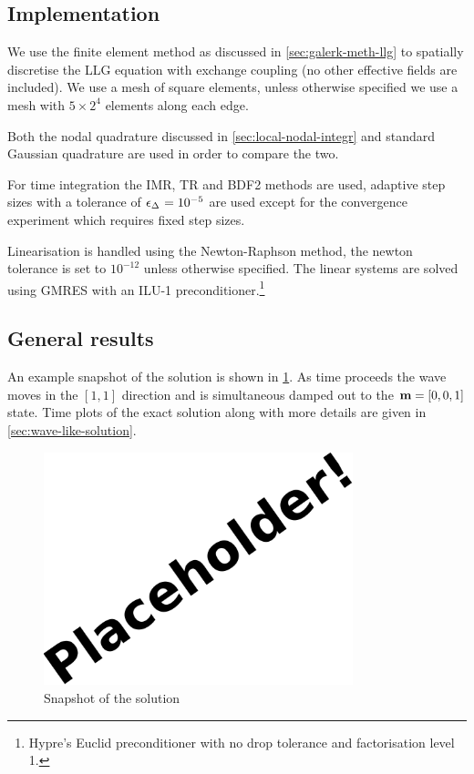 \subsection{Implementation}

We use the finite element method as discussed in \cref{sec:galerk-meth-llg} to spatially discretise the LLG equation with exchange coupling (no other effective fields are included).
We use a mesh of square elements, %
unless otherwise specified we use a mesh with $5 \times 2^4$ elements along each edge.

Both the nodal quadrature discussed in \cref{sec:local-nodal-integr} and standard Gaussian quadrature are used in order to compare the two.

For time integration the IMR, TR and BDF2 methods are used, adaptive step sizes with a tolerance of $\epsilon_{\Delta_{}} = 10^{-5}$ are used except for the convergence experiment which requires fixed step sizes. 

Linearisation is handled using the Newton-Raphson method, the newton tolerance is set to $10^{-12}$ unless otherwise specified.
The linear systems are solved using GMRES with an ILU-1 preconditioner.\footnote{Hypre's Euclid preconditioner \cite{hypre} with no drop tolerance and factorisation level 1.}


\subsection{General results}


An example snapshot of the solution is shown in \cref{fig:2d-wave-snapshot}.
As time proceeds the wave moves in the $[1,1]$ direction and is simultaneous damped out to the $\mathbf{m} = [0,0,1]$ state.
Time plots of the exact solution along with more details are given in \cref{sec:wave-like-solution}.

\begin{figure}
  \centering
  \includegraphics[width=0.8\textwidth]{images/placeholder}
  \caption{Snapshot of the solution}
  \label{fig:2d-wave-snapshot}
\end{figure}



